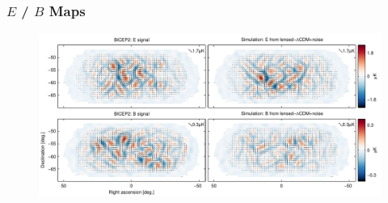\documentclass[]{beamer}
\begin{document}
\begin{frame}
  \frametitle{$E$ / $B$ Maps}
  \begin{figure}
    \centering
    \includegraphics[width=\columnwidth]{eb_maps}
  \end{figure}
\end{frame}
\end{document}
